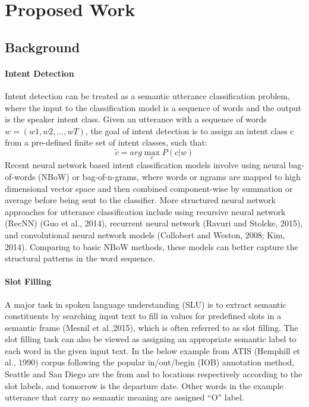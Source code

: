 \chapter{Proposed Work}

\section{Background}
\subsubsection{Intent Detection}
Intent detection can be treated as a semantic utterance classification problem, where the input to the classification model is a sequence of words and the output is the speaker intent class. Given an utterance with a sequence of words $w = (w1, w2, ..., wT)$, the goal of intent detection is to assign an intent class c from a pre-defined finite set of intent classes, such that:
\begin{equation}
\tilde{c} = arg\max_{c} P(c | w)
\end{equation}
Recent neural network based intent classification models involve using neural bag-of-words
(NBoW) or bag-of-n-grams, where words or ngrams are mapped to high dimensional vector
space and then combined component-wise by summation or average before being sent to the
classifier. More structured neural network approaches for utterance classification include using recursive neural network (RecNN) (Guo et al., 2014), recurrent neural network (Ravuri and Stolcke, 2015), and convolutional neural network models (Collobert and Weston, 2008; Kim, 2014). Comparing to basic NBoW methods, these models can better capture the structural patterns in the word sequence.

\subsubsection{Slot Filling}
A major task in spoken language understanding (SLU) is to extract semantic constituents by
searching input text to fill in values for predefined slots in a semantic frame (Mesnil et al.,2015), which is often referred to as slot filling. The slot filling task can also be viewed as assigning an appropriate semantic label to each word in the given input text. In the below example from ATIS (Hemphill et al., 1990) corpus following the popular in/out/begin (IOB) annotation method, Seattle and San Diego are the from and to locations respectively according to the slot labels, and tomorrow is the departure date. Other words in the
example utterance that carry no semantic meaning are assigned “O” label.

